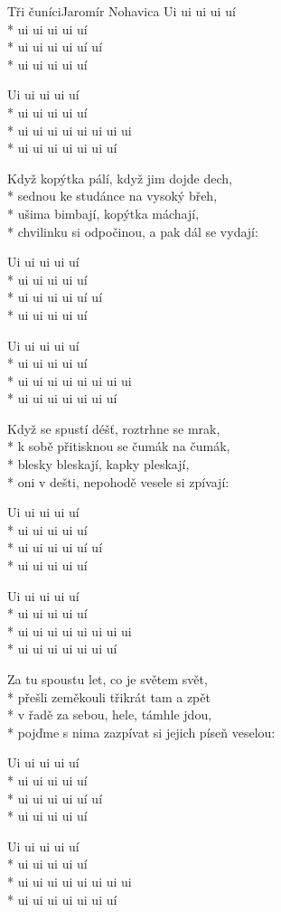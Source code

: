 \documentclass[10.5pt]{book}
\begin{document}
\begin{poem}{Tři čuníci}{Jaromír Nohavica}
Ui ui ui ui uí\\*
ui ui ui ui uí\\*
ui ui ui ui uí uí\\*
ui ui ui ui uí

Ui ui ui ui uí\\*
ui ui ui ui uí\\*
ui ui ui ui ui ui ui ui\\*
ui ui ui ui ui ui uí

Když kopýtka pálí, když jim dojde dech,\\*
sednou ke studánce na vysoký břeh,\\*
ušima bimbají, kopýtka máchají,\\*
chvilinku si odpočinou, a pak dál se vydají: 

Ui ui ui ui uí\\*
ui ui ui ui uí\\*
ui ui ui ui uí uí\\*
ui ui ui ui uí

Ui ui ui ui uí\\*
ui ui ui ui uí\\*
ui ui ui ui ui ui ui ui\\*
ui ui ui ui ui ui uí

Když se spustí déšť, roztrhne se mrak,\\*
k sobě přitisknou se čumák na čumák,\\*
blesky bleskají, kapky pleskají,\\*
oni v dešti, nepohodě vesele si zpívají: 

Ui ui ui ui uí\\*
ui ui ui ui uí\\*
ui ui ui ui uí uí\\*
ui ui ui ui uí

Ui ui ui ui uí\\*
ui ui ui ui uí\\*
ui ui ui ui ui ui ui ui\\*
ui ui ui ui ui ui uí

Za tu spoustu let, co je světem svět,\\*
přešli zeměkouli třikrát tam a zpět\\*
v řadě za sebou, hele, támhle jdou,\\*
pojďme s nima zazpívat si jejich píseň veselou: 

Ui ui ui ui uí\\*
ui ui ui ui uí\\*
ui ui ui ui uí uí\\*
ui ui ui ui uí

Ui ui ui ui uí\\*
ui ui ui ui uí\\*
ui ui ui ui ui ui ui ui\\*
ui ui ui ui ui ui uí

\end{poem}
\end{document}
